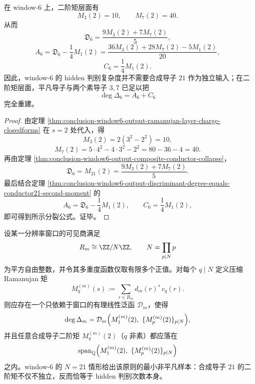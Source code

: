 \begin{corollary}\label{cor:conclusion-window6-output-discriminant-anomaly-collision-prime-conductor-splitting}
在 window-\(6\) 上，二阶矩层面有
\[
M_3(2)=10,
\qquad
M_7(2)=40.
\]
从而
\[
\mathfrak D_6=\frac{9M_3(2)+7M_7(2)}{5},
\]
\[
A_6=\mathfrak D_6-\frac14 M_1(2)
=\frac{36M_3(2)+28M_7(2)-5M_1(2)}{20},
\]
\[
C_6=\frac14 M_1(2).
\]
因此，window-\(6\) 的 hidden 判别复杂度并不需要合成导子 \(21\) 作为独立输入；在二阶矩层面，平凡导子与两个素导子 \(3,7\) 已足以把
\[
\deg\Delta_6=A_6+C_6
\]
完全重建。
\end{corollary}
\begin{proof}
由定理 \ref{thm:conclusion-window6-output-ramanujan-layer-charge-closedforms} 在 \(s=2\) 处代入，得
\[
M_3(2)=2(3^2-2^2)=10,
\]
\[
M_7(2)=5\cdot 4^2-4\cdot 3^2-2^2=80-36-4=40.
\]
再由定理 \ref{thm:conclusion-window6-output-composite-conductor-collapse}，
\[
\mathfrak D_6=M_{21}(2)=\frac{9M_3(2)+7M_7(2)}{5}.
\]
最后结合定理 \ref{thm:conclusion-window6-output-discriminant-degree-equals-conductor21-second-moment} 的
\[
A_6=\mathfrak D_6-\frac14 M_1(2),
\qquad
C_6=\frac14 M_1(2),
\]
即可得到所示分裂公式。证毕。
\end{proof}

\begin{conjecture}\label{conj:conclusion-window6-output-prime-conductor-discriminant-shadow}
设某一分辨率窗口的可见商满足
\[
R_m\cong \ZZ/N\ZZ,
\qquad
N=\prod_{p\mid N}p
\]
为平方自由整数，并令其多重度函数仅取有限多个正值。对每个 \(q\mid N\) 定义压缩 Ramanujan 矩
\[
M_q^{(m)}(s):=\sum_{r\in R_m}d_m(r)^s\,c_q(r).
\]
则应存在一个只依赖于窗口的有理线性泛函 \(\mathcal D_m\)，使得
\[
\deg \Delta_m
=
\mathcal D_m\Bigl(M_1^{(m)}(2),\ \{M_p^{(m)}(2)\}_{p\mid N}\Bigr),
\]
并且任意合成导子二阶矩 \(M_q^{(m)}(2)\)（\(q\) 非素）都应落在
\[
\operatorname{span}_{\mathbb Q}
\Bigl(M_1^{(m)}(2),\ \{M_p^{(m)}(2)\}_{p\mid N}\Bigr)
\]
之内。window-\(6\) 的 \(N=21\) 情形给出该原则的最小非平凡样本：合成导子 \(21\) 的二阶矩不仅不独立，反而恰等于 hidden 判别次数本身。
\end{conjecture}
